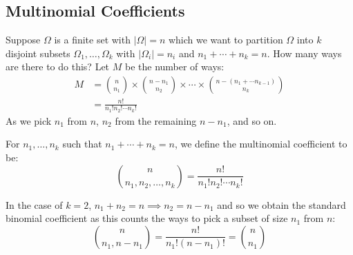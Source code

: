 \documentclass[../main.tex]{subfiles}
\begin{document}
\subsection{Multinomial Coefficients}
\label{multinomialCoefficients}
Suppose $\Omega$ is a finite set with $|\Omega| = n$ which we want to partition $\Omega$ into $k$ disjoint subsets $\Omega_1, \ldots, \Omega_k$ with $|\Omega_i| = n_i$ and $n_1 + \cdots + n_k = n$.
How many ways are there to do this?
Let $M$ be the number of ways:
\begin{align*}
  M &= \binom{n}{n_1} \times \binom{n - n_1}{n_2} \times \cdots \times \binom{n - (n_1 + \cdots n_{k - 1})}{n_k} \\
    &= \frac{n!}{n_1! n_2! \cdots n_k!}
\end{align*}
As we pick $n_1$ from $n$, $n_2$ from the remaining $n - n_1$, and so on.
\begin{definition}
  For $n_1, \ldots, n_k$ such that $n_1 + \cdots + n_k = n$, we define the multinomial coefficient to be:
  \[
    \binom{n}{n_1, n_2, \ldots, n_k} = \frac{n!}{n_1! n_2! \cdots n_k!}
  \]
\end{definition}
\begin{remark}
  In the case of $k = 2$, $n_1 + n_2 = n \implies n_2 = n - n_1$ and so we obtain the standard binomial coefficient as this counts the ways to pick a subset of size $n_1$ from $n$:
  \[
    \binom{n}{n_1, n - n_1} = \frac{n!}{n_1!(n - n_1)!} = \binom{n}{n_1}
  \]
\end{remark}
\end{document}
